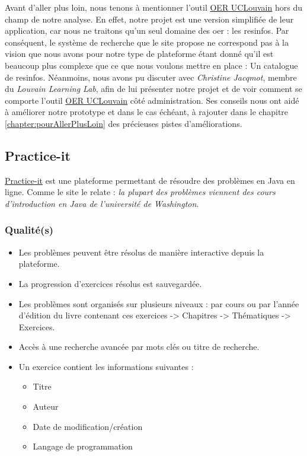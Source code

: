 Avant d'aller plus loin, nous tenons à mentionner l'outil \href{https://oer.uclouvain.be/}{OER UCLouvain} hors du champ de notre analyse. En effet, notre projet est une version simplifiée de leur application, car nous ne traitons qu'un seul domaine des \gls{oer} : les \glspl{resinfo}. Par conséquent, le système de recherche que le site propose ne correspond pas à la vision que nous avons pour notre type de plateforme étant donné qu'il est beaucoup plus complexe que ce que nous voulons mettre en place : Un catalogue de \glspl{resinfo}. Néanmoins, nous avons pu discuter avec \textit{Christine Jacqmot}, membre du \textit{Louvain Learning Lab}, afin de lui présenter notre projet et de voir comment se comporte l'outil \href{https://oer.uclouvain.be/}{OER UCLouvain} côté administration. Ses conseils nous ont aidé à améliorer notre prototype et dans le cas échéant, à rajouter dans le chapitre \ref{chapter:pourAllerPlusLoin} des précieuses pistes d'améliorations.
\pagebreak
\subsection*{Practice-it}

\href{https://practiceit.cs.washington.edu/problem/list}{Practice-it} est une plateforme permettant de résoudre des problèmes en Java en ligne. Comme le site le relate : \textit{la plupart des problèmes viennent des cours d'introduction en Java de l'université de Washington}.

\subsubsection*{Qualité(s)}

\begin{itemize}
    \item Les problèmes peuvent être résolus de manière interactive depuis la plateforme.
    \item La progression d'exercices résolus est sauvegardée.
    \item Les problèmes sont organisés sur plusieurs niveaux : par cours ou par l'année d'édition du livre contenant ces exercices -> Chapitres -> Thématiques -> Exercices.
    \item Accès à une recherche avancée par mots clés ou titre de recherche.
    \item Un exercice contient les informations suivantes :
    \begin{itemize}
        \item Titre
        \item Auteur
        \item Date de modification/création
        \item Langage de programmation
    \end{itemize}
\end{itemize}

